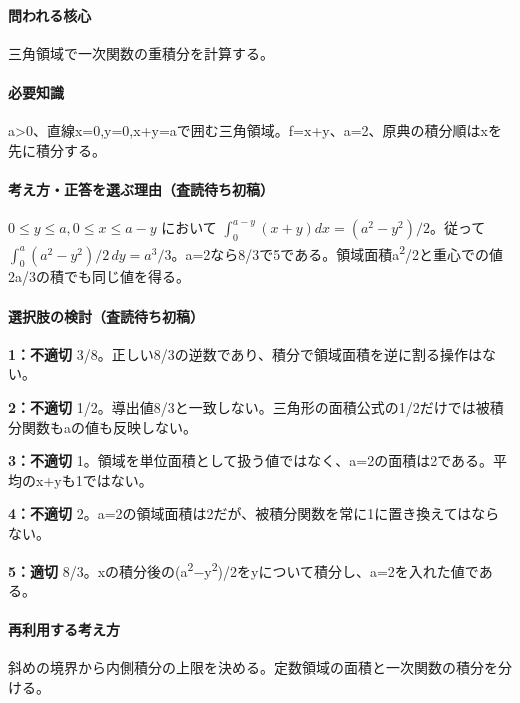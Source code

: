\paragraph{問われる核心} 三角領域で一次関数の重積分を計算する。

\paragraph{必要知識} a>0、直線x=\allowbreak{}0,y=\allowbreak{}0,x+y=\allowbreak{}aで囲む三角領域。f=\allowbreak{}x+y、a=\allowbreak{}2、原典の積分順はxを先に積分する。

\paragraph{考え方・正答を選ぶ理由（査読待ち初稿）} \(0\le y\le a,0\le x\le a-y\) において \(\int_0^{a-y}(x+y)dx=(a^2-y^2)/2\)。従って \(\int_0^a(a^2-y^2)/2\,dy=a^3/3\)。a=\allowbreak{}2なら8/3で5である。領域面積a\textsuperscript{2}/2と重心での値2a/3の積でも同じ値を得る。

\paragraph{選択肢の検討（査読待ち初稿）}\mbox{}\par

\noindent\textbf{1：不適切} 3/8。正しい8/3の逆数であり、積分で領域面積を逆に割る操作はない。\par

\noindent\textbf{2：不適切} 1/2。導出値8/3と一致しない。三角形の面積公式の1/2だけでは被積分関数もaの値も反映しない。\par

\noindent\textbf{3：不適切} 1。領域を単位面積として扱う値ではなく、a=\allowbreak{}2の面積は2である。平均のx+yも1ではない。\par

\noindent\textbf{4：不適切} 2。a=\allowbreak{}2の領域面積は2だが、被積分関数を常に1に置き換えてはならない。\par

\noindent\textbf{5：適切} 8/3。xの積分後の(a\textsuperscript{2}−y\textsuperscript{2})/2をyについて積分し、a=\allowbreak{}2を入れた値である。\par

\paragraph{再利用する考え方} 斜めの境界から内側積分の上限を決める。定数領域の面積と一次関数の積分を分ける。

